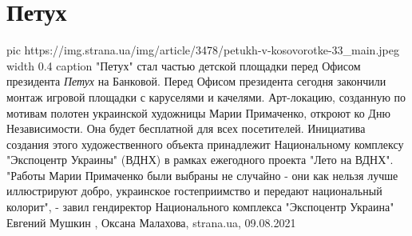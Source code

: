  
 
 
 
 
\chapter{Петух}

\ifcmt
  pic https://img.strana.ua/img/article/3478/petukh-v-kosovorotke-33_main.jpeg
  width 0.4
	caption "Петух" стал частью детской площадки перед Офисом президента 
\fi
\emph{Петух} на Банковой.  Перед Офисом президента сегодня закончили монтаж игровой
площадки с каруселями и качелями. Арт-локацию, созданную по мотивам полотен
украинской художницы Марии Примаченко, откроют ко Дню Независимости. Она будет
бесплатной для всех посетителей.  Инициатива создания этого художественного
объекта принадлежит Национальному комплексу "Экспоцентр Украины" (ВДНХ) в
рамках ежегодного проекта "Лето на ВДНХ".  "Работы Марии Примаченко были
выбраны не случайно - они как нельзя лучше иллюстрируют добро, украинское
гостеприимство и передают национальный колорит", - завил гендиректор
Национального комплекса "Экспоцентр Украина" Евгений Мушкин
, 
Оксана Малахова, strana.ua, 09.08.2021
